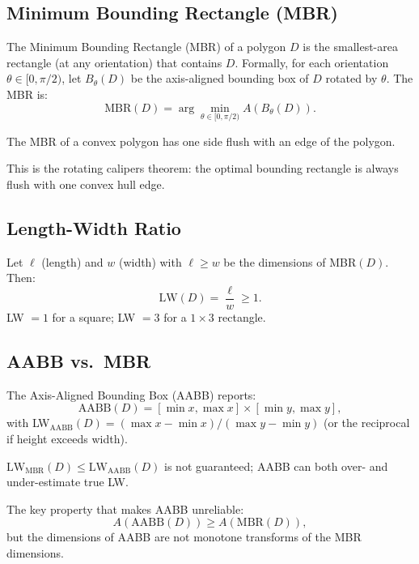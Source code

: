 \subsection{Minimum Bounding Rectangle (MBR)}

The Minimum Bounding Rectangle (MBR) of a polygon $D$ is the smallest-area
rectangle (at any orientation) that contains $D$.
Formally, for each orientation $\theta \in [0, \pi/2)$, let $B_\theta(D)$ be
the axis-aligned bounding box of $D$ rotated by $\theta$.
The MBR is:
\[
  \text{MBR}(D) = \arg\min_{\theta \in [0,\pi/2)} A(B_\theta(D)).
\]

\begin{proposition}
  The MBR of a convex polygon has one side flush with an edge of the polygon.
\end{proposition}

This is the rotating calipers theorem: the optimal bounding rectangle is
always flush with one convex hull edge.

\subsection{Length-Width Ratio}

Let $\ell$ (length) and $w$ (width) with $\ell \geq w$ be the dimensions of MBR$(D)$.
Then:
\begin{equation}
  \text{LW}(D) = \frac{\ell}{w} \geq 1.
  \label{eq:lw}
\end{equation}
LW $= 1$ for a square; LW $= 3$ for a $1 \times 3$ rectangle.

\subsection{AABB vs.\ MBR}

The Axis-Aligned Bounding Box (AABB) reports:
\[
  \text{AABB}(D) = [\min x, \max x] \times [\min y, \max y],
\]
with LW$_{\text{AABB}}(D) = (\max x - \min x) / (\max y - \min y)$
(or the reciprocal if height exceeds width).

\begin{proposition}
  $\text{LW}_{\text{MBR}}(D) \leq \text{LW}_{\text{AABB}}(D)$
  is not guaranteed; AABB can both over- and under-estimate true LW.
\end{proposition}

The key property that makes AABB unreliable:
\[
  A(\text{AABB}(D)) \geq A(\text{MBR}(D)),
\]
but the dimensions of AABB are not monotone transforms of the MBR dimensions.


